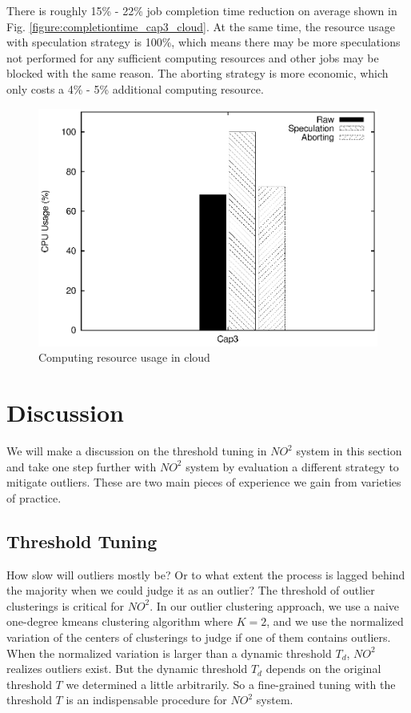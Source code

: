 There is roughly 15\% - 22\% job completion time reduction on average shown in Fig.
\ref{figure:completiontime_cap3_cloud}. At the same time, the resource usage with
speculation strategy is 100\%, which means there may be more speculations not performed
for any sufficient computing resources and other jobs may be blocked with the same reason.
The aborting strategy is more economic, which only costs a 4\% - 5\% additional computing
resource.

\begin{figure}
\centering
\includegraphics[width=0.9\columnwidth]{figures/cloud_resource_usage.eps}
\caption{Computing resource usage in cloud}
\label{figure:resourceusage_cloud}
\end{figure}

\section{Discussion} \label{sec-discussion}

We will make a discussion on the threshold tuning in $NO^2$ system in this section and take
one step further with $NO^2$ system by evaluation a different strategy to mitigate
outliers. These are two main pieces of experience we gain from varieties of practice.

\subsection{Threshold Tuning}

How slow will outliers mostly be? Or to what extent the process is lagged behind the majority when we could
judge it as an outlier? The threshold of outlier clusterings is critical for $NO^2$. In our
outlier clustering approach, we use a naive one-degree kmeans clustering algorithm where
$K = 2$, and we use the normalized variation of the centers of clusterings to judge if one
of them contains outliers. When the normalized variation is larger than a dynamic
threshold $T_d$, $NO^2$ realizes outliers exist. But the dynamic threshold $T_d$ depends
on the original threshold $T$ we determined a little arbitrarily. So a fine-grained tuning
with the threshold $T$ is an indispensable procedure for $NO^2$ system.

